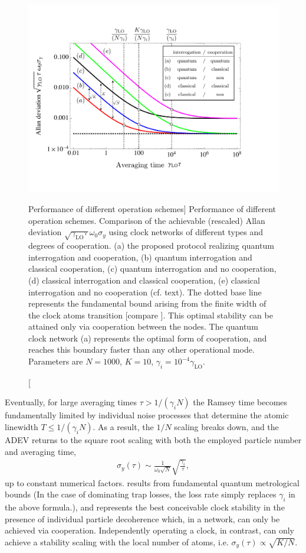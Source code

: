 \begin{figure}
\centering
\includegraphics[width=1\textwidth]{./figs_Komar2014/fig3.pdf}
\caption
[Performance of different operation schemes]
{
\label{fig:comp}
Performance of different operation schemes. Comparison of
the achievable (rescaled) Allan deviation $\sqrt{\gamma_\mathrm{LO} \tau} \omega_0 \sigma_y$ using clock networks of different types and degrees of
cooperation. (a) the proposed protocol realizing quantum interrogation and
cooperation, (b) quantum interrogation and classical cooperation, (c) quantum
interrogation and no cooperation, (d) classical interrogation and classical
cooperation, (e) classical interrogation and no cooperation (cf. text). The
dotted base line represents the fundamental bound arising from the finite width
of the clock atoms transition
[compare ]. This optimal stability can be attained only via cooperation between the
nodes.
The quantum clock network (a) represents the optimal form of cooperation, and reaches this boundary faster than any other
operational mode. Parameters are $N=1000$, $K=10$,
$\gamma_i=10^{-4}\gamma_\mathrm{LO}$.
 }
\end{figure}



Eventually, for large averaging times $\tau > 1/(\gamma_i N)$ the
Ramsey time becomes fundamentally limited by individual
noise processes that determine the atomic linewidth $T\leq 1/(\gamma_i N)$.
As a result, the $1/N$ scaling breaks down, and the ADEV returns to the square
root scaling with both the employed particle number and averaging time,
\begin{align}
\label{eq:ADEV2}
	\sigma_y(\tau) \sim \frac{ 1}{\omega_0 \sqrt N}
	\sqrt{\frac{\gamma_i}{\tau}},
\end{align}
up to constant numerical factors.   results from fundamental
quantum metrological bounds \cite{Escher:2011fn} (In the case of
dominating trap losses, the loss rate simply replaces $\gamma_i$ in the above
formula.), and represents the best conceivable clock stability in the presence
of individual particle decoherence which, in a network, can only be achieved via cooperation. Independently operating a clock, in contrast, can only achieve a stability scaling with the local number of atoms, i.e. $\sigma_y(\tau)\propto \sqrt{K/N}$.


